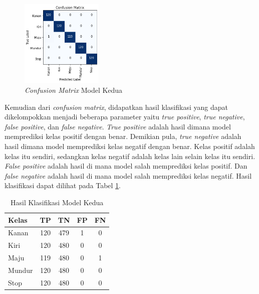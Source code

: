 \begin{figure} [H] \centering
  \includegraphics[width=0.35\textwidth]{gambar/bab4/modelkedua/modelkedua.png}
  \caption{\emph{Confusion Matrix} Model Kedua}
  \label{fig:matrix1}
\end{figure}

Kemudian dari \emph{confusion matrix}, didapatkan hasil klasifikasi yang dapat dikelompokkan menjadi beberapa parameter yaitu \emph{true positive}, \emph{true negative}, \emph{false positive}, dan \emph{false negative}. \emph{True positive} adalah hasil dimana model memprediksi kelas positif dengan benar. Demikian pula, \emph{true negative} adalah hasil dimana model memprediksi kelas negatif dengan benar. Kelas positif adalah kelas itu sendiri, sedangkan kelas negatif adalah kelas lain selain kelas itu sendiri. \emph{False positive} adalah hasil di mana model salah memprediksi kelas positif. Dan \emph{false negative} adalah hasil di mana model salah memprediksi kelas negatif. Hasil klasifikasi dapat dilihat pada Tabel \ref{tb:cm_model}.

\begin{longtable}{|l|c|c|c|c|}
  \caption{Hasil Klasifikasi Model Kedua}
  \label{tb:cm_model} \\
  \hline
  \rowcolor[HTML]{C0C0C0} 
  \textbf{Kelas} & \textbf{TP} & \textbf{TN} & \textbf{FP} & \textbf{FN} \\ \hline
  Kanan    & 120          & 479         & 1           & 0           \\ \hline
  Kiri      & 120          & 480         & 0           & 0           \\ \hline
  Maju      & 119          & 480         & 0           & 1           \\ \hline
  Mundur     & 120          & 480         & 0           & 0           \\ \hline
  Stop  & 120          & 480         & 0           & 0           \\ \hline
\end{longtable}

